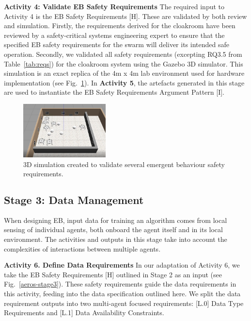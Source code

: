 \documentclass{article}
\begin{document}
\noindent\textbf{Activity 4: Validate EB Safety Requirements} The required input to Activity 4 is the EB Safety Requirements [H].  
These are validated by both review and simulation.
Firstly, the requirements derived for the cloakroom have been reviewed by a safety-critical systems engineering expert to ensure that the specified EB safety requirements for the swarm will deliver its intended safe operation. Secondly, we validated all safety requirements (excepting RQ3.5 from Table~\ref{tab:reqs}) for the cloakroom system using the Gazebo 3D simulator. 
This simulation is an exact replica of the 4m x 4m lab environment used for hardware implementation (see Fig.~\ref{3Dsim}). 
In \textbf{Activity 5}, the artefacts generated in this stage are used to instantiate the EB Safety Requirements Argument Pattern [I].
\begin{figure}[!h]
	\centering
	\includegraphics[trim={30mm 25mm 45mm 30mm},clip,width=0.4\textwidth]{3Dsim.png}
	\caption{3D simulation created to validate several emergent behaviour safety requirements.}
	\label{3Dsim}
\end{figure}

\subsection{Stage 3: Data Management} \label{framework-stage3}
When designing EB, input data for training an algorithm comes from local sensing of individual agents, both onboard the agent itself and in its local environment. The activities and outputs in this stage take into account the complexities of interactions between multiple agents.

\noindent\textbf{Activity 6. Define Data Requirements} In our adaptation of Activity 6, we take the EB Safety Requirements [H] outlined in Stage 2 as an input (see Fig.~\ref{aeros-stage3}). These safety requirements guide the data requirements in this activity, feeding into the data specification outlined here. We split the data requirement outputs into two multi-agent focused requirements: [L.0] Data Type Requirements and [L.1] Data Availability Constraints.
\end{document}
